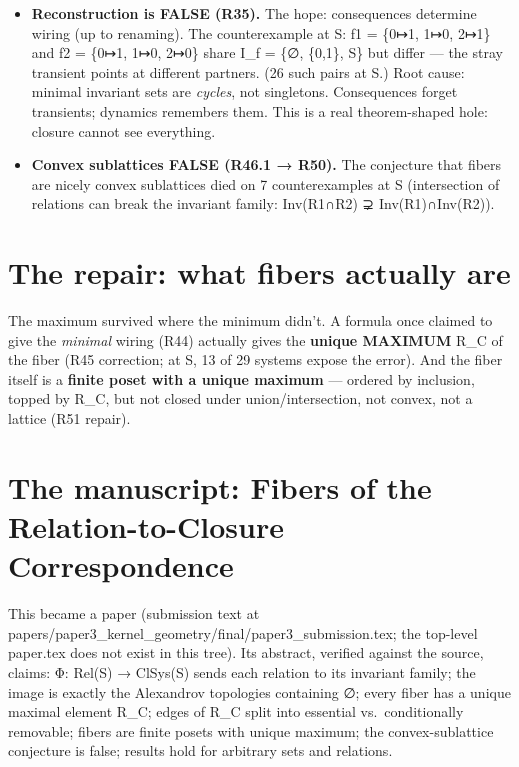 \documentclass[
  11pt,
]{book}
\providecommand{\tightlist}{%
  \setlength{\itemsep}{0pt}\setlength{\parskip}{0pt}}
\begin{document}
\begin{itemize}
\tightlist
\item
  \textbf{Reconstruction is FALSE (R35).} The hope: consequences
  determine wiring (up to renaming). The counterexample at
  \textbar S: f1 = \{0↦1, 1↦0, 2↦1\} and f2 = \{0↦1, 1↦0,
  2↦0\} share I\_f = \{∅, \{0,1\}, S\} but differ --- the stray
  transient points at different partners. (26 such pairs at
  \textbar S.) Root cause: minimal invariant sets are
  \emph{cycles}, not singletons. Consequences forget transients;
  dynamics remembers them. This is a real theorem-shaped hole: closure
  cannot see everything.
\item
  \textbf{Convex sublattices FALSE (R46.1 → R50).} The conjecture that
  fibers are nicely convex sublattices died on 7 counterexamples at
  \textbar S (intersection of relations can break the
  invariant family: Inv(R1∩R2) ⊋ Inv(R1)∩Inv(R2)).
\end{itemize}

\section{The repair: what fibers actually
are}\label{the-repair-what-fibers-actually-are}

The maximum survived where the minimum didn't. A formula once claimed to
give the \emph{minimal} wiring (R44) actually gives the \textbf{unique
MAXIMUM} R\_C of the fiber (R45 correction; at \textbar S, 13
of 29 systems expose the error). And the fiber itself is a
\textbf{finite poset with a unique maximum} --- ordered by inclusion,
topped by R\_C, but not closed under union/intersection, not convex, not
a lattice (R51 repair).

\section{The manuscript: Fibers of the Relation-to-Closure
Correspondence}\label{the-manuscript-fibers-of-the-relation-to-closure-correspondence}

This became a paper (submission text at
papers/paper3\_kernel\_geometry/final/paper3\_submission.tex; the
top-level paper.tex does not exist in this tree). Its abstract, verified
against the source, claims: Φ: Rel(S) → ClSys(S) sends each relation to
its invariant family; the image is exactly the Alexandrov topologies
containing ∅; every fiber has a unique maximal element R\_C; edges of
R\_C split into essential vs.~conditionally removable; fibers are finite
posets with unique maximum; the convex-sublattice conjecture is false;
results hold for arbitrary sets and relations.
\end{document}
